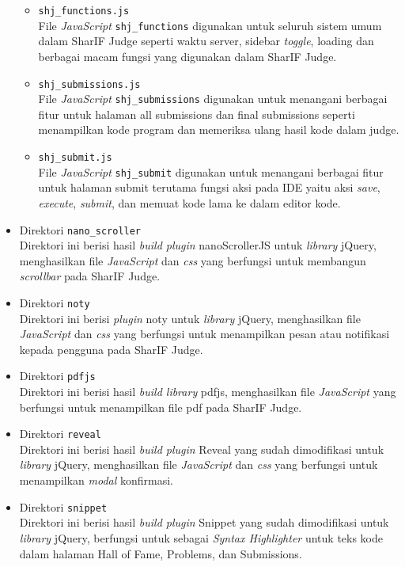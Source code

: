 \begin{itemize}
\begin{itemize}
		      \item \verb|shj_functions.js| \\
		            File \textit{JavaScript} \verb|shj_functions| digunakan untuk seluruh sistem umum dalam SharIF Judge seperti waktu server, sidebar \textit{toggle}, loading dan berbagai macam fungsi yang digunakan dalam SharIF Judge.
		      \item \verb|shj_submissions.js| \\
		            File \textit{JavaScript} \verb|shj_submissions| digunakan untuk menangani berbagai fitur untuk halaman all submissions dan final submissions seperti menampilkan kode program dan memeriksa ulang hasil kode dalam judge.
		      \item \verb|shj_submit.js| \\
		            File \textit{JavaScript} \verb|shj_submit| digunakan untuk menangani berbagai fitur untuk halaman submit terutama fungsi aksi pada IDE yaitu aksi \textit{save}, \textit{execute}, \textit{submit}, dan memuat kode lama ke dalam editor kode.
	      \end{itemize}
	\item Direktori \verb|nano_scroller| \\
	      Direktori ini berisi hasil \textit{build plugin} nanoScrollerJS untuk \textit{library} jQuery, menghasilkan file \textit{JavaScript} dan \textit{css} yang berfungsi untuk membangun \textit{scrollbar} pada SharIF Judge.
	\item Direktori \verb|noty| \\
	      Direktori ini berisi \textit{plugin} noty untuk \textit{library} jQuery, menghasilkan file \textit{JavaScript} dan \textit{css} yang berfungsi untuk menampilkan pesan atau notifikasi kepada pengguna pada SharIF Judge.
	\item Direktori \verb|pdfjs| \\
	      Direktori ini berisi hasil \textit{build library} pdfjs, menghasilkan file \textit{JavaScript} yang berfungsi untuk menampilkan file pdf pada SharIF Judge.
	\item Direktori \verb|reveal| \\
	      Direktori ini berisi hasil \textit{build plugin} Reveal yang sudah dimodifikasi untuk \textit{library} jQuery, menghasilkan file \textit{JavaScript} dan \textit{css} yang berfungsi untuk menampilkan \textit{modal} konfirmasi.
	\item Direktori \verb|snippet| \\
	      Direktori ini berisi hasil \textit{build plugin} Snippet yang sudah dimodifikasi untuk \textit{library} jQuery, berfungsi untuk sebagai \textit{Syntax Highlighter} untuk teks kode dalam halaman Hall of Fame, Problems, dan Submissions.

\end{itemize}

